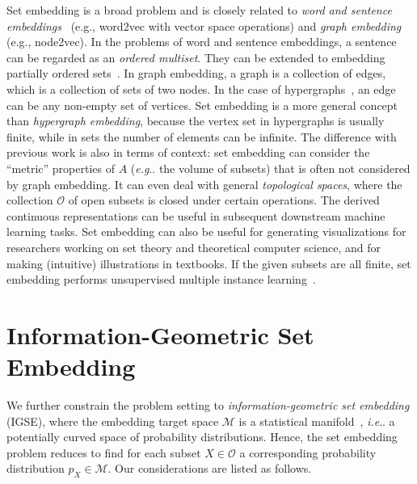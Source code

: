 \documentclass{article}
\makeatletter
\DeclareRobustCommand\onedot{\futurelet\@let@token\bmv@onedotaux}
\def\bmv@onedotaux{\ifx\@let@token.\else.\null\fi\xspace}
\def\eg{\emph{e.g}\onedot} \def\Eg{\emph{E.g}\onedot}
\def\ie{\emph{i.e}\onedot} \def\Ie{\emph{I.e}\onedot}
\makeatother
\begin{document}

Set embedding is a broad problem and is closely related to {\em word and
sentence embeddings}~\cite{word2vec,sentense} (e.g., word2vec with vector space operations)
and {\em graph embedding}~\cite{paDOL,glNSF} (e.g., node2vec).
In the problems of word and sentence embeddings, a sentence can be regarded as an {\em ordered multiset}.
They can be extended to embedding partially ordered sets~\cite{partial}.
In graph embedding, a graph is a collection of edges, which is a collection of sets of two nodes.
In the case of hypergraphs~\cite{zjLWH}, an edge can be any non-empty set of vertices.
Set embedding is a more general concept than {\em hypergraph embedding},
because the vertex set in hypergraphs is usually finite, while in
sets the number of elements can be infinite.
The difference with previous work is also in terms of context:
set embedding can consider the ``metric'' properties of $A$ (\eg the volume of subsets)
that is often not considered by graph embedding.  It can even deal with
general \emph{topological spaces}, where the collection $\mathcal{O}$ of open subsets
is closed under certain operations.
The derived continuous representations can be useful in subsequent  downstream machine learning tasks.
Set embedding can also be useful for generating visualizations for researchers working on set theory
and theoretical computer science, and for making (intuitive) illustrations in textbooks.
If the given subsets are all finite, set embedding performs unsupervised multiple instance learning~\cite{mil}.

\section{Information-Geometric Set Embedding}
We further constrain the problem setting to {\em information-geometric
set embedding} (IGSE), where the embedding target space $\mathcal{M}$ is a statistical manifold~\cite{aIGI},
\ie a potentially curved space of probability distributions.
Hence, the set embedding problem reduces to find for each subset $X\in\mathcal{O}$ a corresponding probability distribution $p_X\in\mathcal{M}$.
Our considerations are listed as follows.
\end{document}
